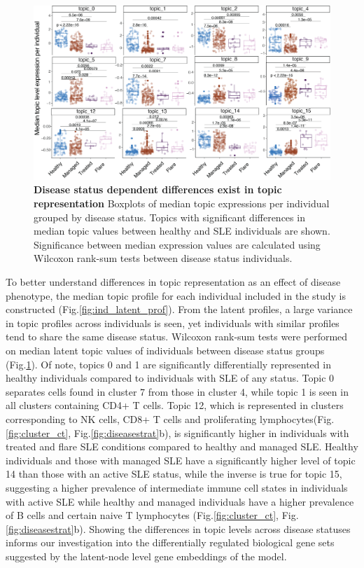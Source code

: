 \begin{figure}
    \centering
    \includegraphics[width=\textwidth]{Figures/median_bxplt.png}
    \caption{\textbf{Disease status dependent differences exist in topic representation} Boxplots of median topic expressions per individual grouped by disease status. Topics with significant differences in median topic values between healthy and SLE individuals are shown. Significance between median expression values are calculated using Wilcoxon rank-sum tests between disease status individuals.}
    \label{fig:ind_bxplt}
\end{figure}

To better understand differences in topic representation as an effect of disease phenotype, the median topic profile for each individual included in the study is constructed (Fig.\ref{fig:ind_latent_prof}). From the latent profiles, a large variance in topic profiles across individuals is seen, yet individuals with similar profiles tend to share the same disease status. Wilcoxon rank-sum tests were performed on median latent topic values of individuals between disease status groups (Fig.\ref{fig:ind_bxplt}). Of note, topics 0 and 1 are  significantly differentially represented in healthy individuals compared to individuals with SLE of any status. Topic 0 separates cells found in cluster 7 from those in cluster 4, while topic 1 is seen in all clusters containing CD4+ T cells. Topic 12, which is represented in clusters corresponding to NK cells, CD8+ T cells and proliferating lymphocytes(Fig.\ref{fig:cluster_ct}, Fig.\ref{fig:diseasestrat}b), is significantly higher in individuals with treated and flare SLE conditions compared to healthy and managed SLE. Healthy individuals and those with managed SLE have a significantly higher level of topic 14 than those with an active SLE status, while the inverse is true for topic 15, suggesting a higher prevalence of intermediate immune cell states in individuals with active SLE while healthy and managed individuals have a higher prevalence of B cells and certain naive T lymphocytes (Fig.\ref{fig:cluster_ct}, Fig.\ref{fig:diseasestrat}b). Showing the differences in topic levels across disease statuses informs our investigation into the differentially regulated biological gene sets suggested by the latent-node level gene embeddings of the model. 


